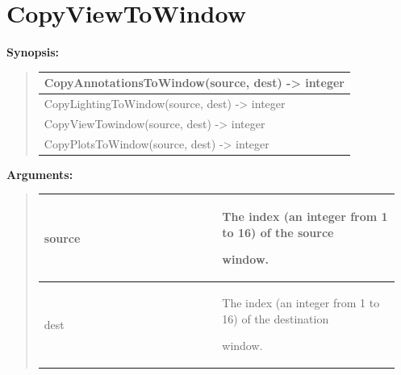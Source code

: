 \documentclass[letterpaper,10pt,english]{sphinxmanual}
\begin{document}
\section{CopyViewToWindow}
\label{functions:copyviewtowindow}
\begin{DUlineblock}{0em}
\item[] \textbf{Synopsis:}
\end{DUlineblock}
\begin{quote}

\begin{tabulary}{\linewidth}{|L|}
\hline

CopyAnnotationsToWindow(source, dest) -\textgreater{} integer
\\
\hline
CopyLightingToWindow(source, dest) -\textgreater{} integer
\\
\hline
CopyViewTowindow(source, dest) -\textgreater{} integer
\\
\hline
CopyPlotsToWindow(source, dest) -\textgreater{} integer
\\
\hline\end{tabulary}

\end{quote}

\begin{DUlineblock}{0em}
\item[] 
\item[] \textbf{Arguments:}
\end{DUlineblock}
\begin{quote}

\begin{tabular}{|p{0.475\linewidth}|p{0.475\linewidth}|}
\hline

source
 & 
\begin{DUlineblock}{0em}
\item[] The index (an integer from 1 to 16) of the source
\item[] window.
\end{DUlineblock}
\\
\hline
dest
 & 
\begin{DUlineblock}{0em}
\item[] The index (an integer from 1 to 16) of the destination
\item[] window.
\end{DUlineblock}
\\
\hline\end{tabular}

\end{quote}
\end{document}
